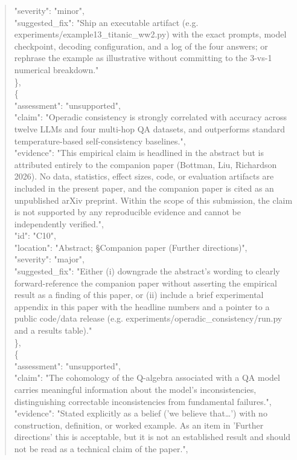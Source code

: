 \documentclass[11pt]{article}
\begin{document}
\begin{quote}
      "severity": "minor",\\
      "suggested\_fix": "Ship an executable artifact (e.g. experiments/example13\_titanic\_ww2.py) with the exact prompts, model checkpoint, decoding configuration, and a log of the four answers; or rephrase the example as illustrative without committing to the 3-vs-1 numerical breakdown."\\
    \},\\
    \{\\
      "assessment": "unsupported",\\
      "claim": "Operadic consistency is strongly correlated with accuracy across twelve LLMs and four multi-hop QA datasets, and outperforms standard temperature-based self-consistency baselines.",\\
      "evidence": "This empirical claim is headlined in the abstract but is attributed entirely to the companion paper (Bottman, Liu, Richardson 2026). No data, statistics, effect sizes, code, or evaluation artifacts are included in the present paper, and the companion paper is cited as an unpublished arXiv preprint. Within the scope of this submission, the claim is not supported by any reproducible evidence and cannot be independently verified.",\\
      "id": "C10",\\
      "location": "Abstract; §Companion paper (Further directions)",\\
      "severity": "major",\\
      "suggested\_fix": "Either (i) downgrade the abstract's wording to clearly forward-reference the companion paper without asserting the empirical result as a finding of this paper, or (ii) include a brief experimental appendix in this paper with the headline numbers and a pointer to a public code/data release (e.g. experiments/operadic\_consistency/run.py and a results table)."\\
    \},\\
    \{\\
      "assessment": "unsupported",\\
      "claim": "The cohomology of the Q-algebra associated with a QA model carries meaningful information about the model's inconsistencies, distinguishing correctable inconsistencies from fundamental failures.",\\
      "evidence": "Stated explicitly as a belief ('we believe that…') with no construction, definition, or worked example. As an item in 'Further directions' this is acceptable, but it is not an established result and should not be read as a technical claim of the paper.",\\

\end{quote}
\end{document}
